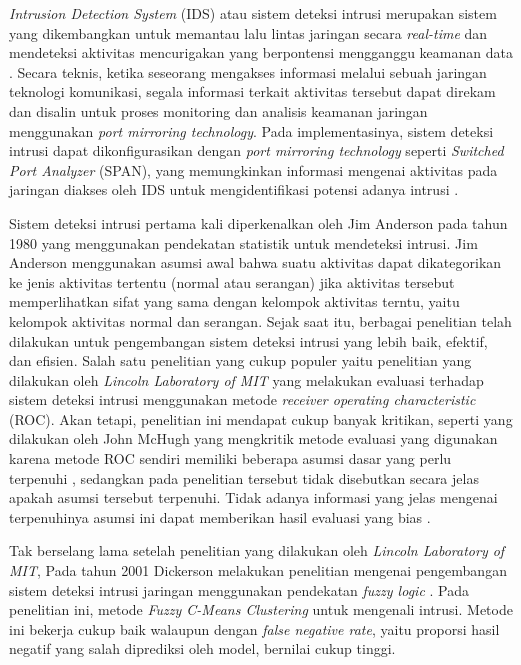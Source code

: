 \documentclass[a4paper,12pt]{report}
\begin{document}
\textit{Intrusion Detection System} (IDS) atau sistem deteksi intrusi merupakan sistem yang dikembangkan untuk memantau lalu lintas jaringan secara \textit{real-time} dan mendeteksi aktivitas mencurigakan yang berpontensi mengganggu keamanan data \cite{andyvictoramanoulEnhancedIntrusionDetection2024}\cite{kimLongShortTerm2016a}\cite{solomonIntrusionDetectionSystem2019}. Secara teknis, ketika seseorang mengakses informasi melalui sebuah jaringan teknologi komunikasi, segala informasi terkait aktivitas tersebut dapat direkam dan disalin untuk proses monitoring dan analisis keamanan jaringan menggunakan \textit{port mirroring technology}. Pada implementasinya, sistem deteksi intrusi dapat dikonfigurasikan dengan \textit{port mirroring technology} seperti \textit{Switched Port Analyzer} (SPAN), yang memungkinkan informasi mengenai aktivitas pada jaringan diakses oleh IDS untuk mengidentifikasi potensi adanya intrusi \cite{liMachineLearningAlgorithms2019}.

Sistem deteksi intrusi pertama kali diperkenalkan oleh Jim Anderson pada tahun 1980 \cite{andersonComputerSecurityThreat1980} yang menggunakan pendekatan statistik untuk mendeteksi intrusi. Jim Anderson menggunakan asumsi awal bahwa suatu aktivitas dapat dikategorikan ke jenis aktivitas tertentu (normal atau serangan) jika aktivitas tersebut memperlihatkan sifat yang sama dengan kelompok aktivitas terntu, yaitu kelompok aktivitas normal dan serangan. Sejak saat itu, berbagai penelitian telah dilakukan untuk pengembangan sistem deteksi intrusi yang lebih baik, efektif, dan efisien. Salah satu penelitian yang cukup populer yaitu penelitian yang dilakukan oleh \textit{Lincoln Laboratory of MIT} yang melakukan evaluasi terhadap sistem deteksi intrusi menggunakan metode \textit{receiver operating characteristic} (ROC). Akan tetapi, penelitian ini mendapat cukup banyak kritikan, seperti yang dilakukan oleh John McHugh yang mengkritik metode evaluasi yang digunakan karena metode ROC sendiri memiliki beberapa asumsi dasar yang perlu terpenuhi \cite{mchugh1998LincolnLaboratory2000}, sedangkan pada penelitian tersebut tidak disebutkan secara jelas apakah asumsi tersebut terpenuhi. Tidak adanya informasi yang jelas mengenai terpenuhinya asumsi ini dapat memberikan hasil evaluasi yang bias \cite{mchughTestingIntrusionDetection2000}. 

Tak berselang lama setelah penelitian yang dilakukan oleh \textit{Lincoln Laboratory of MIT}, Pada tahun 2001 Dickerson melakukan penelitian mengenai pengembangan sistem deteksi intrusi jaringan menggunakan pendekatan \textit{fuzzy logic} \cite{dickersonFuzzyIntrusionDetection2001}. Pada penelitian ini, metode \textit{Fuzzy C-Means Clustering} untuk mengenali intrusi. Metode ini bekerja cukup baik walaupun dengan \textit{false negative rate}, yaitu proporsi hasil negatif yang salah diprediksi oleh model, bernilai cukup tinggi.
\end{document}
